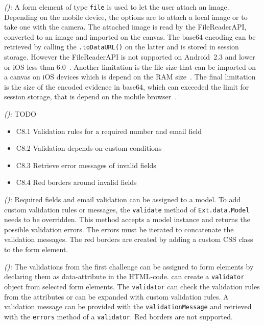 \documentclass[a4paper]{artikel3}
\newcommand{\code}[1]{\texttt{#1}}
\newcommand{\setspace}[0]{\vspace{2mm}}
\renewcommand{\paragraph}[1]{\setspace \noindent {\bf #1}  }
\newcommand{\framework}[2]{ \emph{#1 (\textbf{#2}): }} %
\newcommand{\challenge}[1]{\paragraph{#1}}
\begin{document}
\framework{\jqma{}}{}
A form element of type \code{file} is used to let the user attach an image.
Depending on the mobile device, the options are to attach a local image or to take one with the camera.
The attached image is read by the FileReaderAPI, converted to an image and imported on the canvas.
The base64 encoding can be retrieved by calling the \code{.toDataURL()} on the latter and is stored in session storage.
However the FileReaderAPI is not supported on Android~2.3 and lower or iOS less than 6.0~\cite{Deveria2013a}.
Another limitation is the file size that can be imported on a canvas on iOS devices which is depend on the RAM size~\cite{Apple2012}.
The final limitation is the size of the encoded evidence in base64, which can exceeded the limit for session storage, that is depend on the mobile browser~\cite{Gonzalez2012}.

\framework{\lungoa{}}{}
TODO



\challenge{\chal{validatie}}
\begin{itemize}
 \item C8.1 Validation rules for a required number and email field 
 \item C8.2 Validation depends on custom conditions 
 \item C8.3 Retrieve error messages of invalid fields
 \item C8.4 Red borders around invalid fields 
\end{itemize}

\framework{\sta{}}{}
Required fields and email validation can be assigned to a model.  
To add custom validation rules or messages,  the \code{validate} method of \code{Ext.data.Model} needs to be overridden.  
This method accepts a model instance and returns the possible validation errors.  
The errors must be iterated to concatenate the validation messages.
The red borders are created by adding a custom CSS class to the form element.

\framework{\kendoa{}}{}
The validations from the first challenge can be assigned to form elements by declaring them as data-attribute in the HTML-code.
\kendo{} can create a \code{validator} object from selected form elements.
The \code{validator} can check the validation rules from the attributes or can be expanded with custom validation rules.
A validation message can be provided with the \code{validationMessage} and retrieved with the \code{errors} method of a \code{validator}.
Red borders are not supported.
\end{document}
